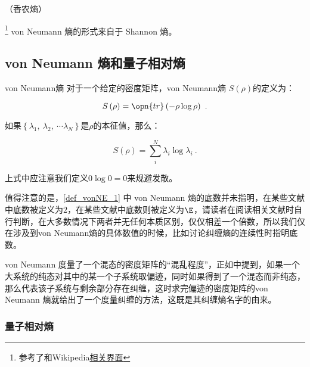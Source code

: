 
\begin{issues}
\issueTODO
\issueMissDepend（香农熵）
\end{issues}


\footnote{参考了\cite{量子信息}和Wikipedia\href{https://en.wikipedia.org/wiki/Von_Neumann_entropy}{相关界面}}
von Neumann 熵的形式来自于 Shannon 熵。

\subsection{von Neumann 熵和量子相对熵}

\begin{definition}{von Neumann熵}\label{def_vonNE_1}
对于一个给定的密度矩阵，von Neumann熵 $S\left(\rho\right)$的定义为：

\begin{equation}
S\left( \rho \right) = \opn{tr}\left( - \rho \log \rho \right)~.
\end{equation}

如果$\left\{ \lambda_1,~\lambda_2,~\cdots \lambda_N \right\}$是$\rho$的本征值，那么：

\begin{equation}
S\left(\rho\right) = \sum_i^N \lambda_i \log \lambda_i~.
\end{equation}

上式中应注意我们定义$0\log0 = 0$来规避发散。

\end{definition}

值得注意的是，\autoref{def_vonNE_1} 中 von Neumann 熵的底数并未指明，在某些文献中底数被定义为$2$，在某些文献中底数则被定义为$\E$，请读者在阅读相关文献时自行判断，在大多数情况下两者并无任何本质区别，仅仅相差一个倍数，所以我们仅在涉及到von Neumann熵的具体数值的时候，比如讨论纠缠熵的连续性时指明底数。

von Neumann 度量了一个混态的密度矩阵的“混乱程度”，正如中提到，如果一个大系统的纯态对其中的某一个子系统取偏迹，同时如果得到了一个混态而非纯态，那么代表该子系统与剩余部分存在纠缠，这时求完偏迹的密度矩阵的von Neumann 熵就给出了一个度量纠缠的方法，这既是其纠缠熵名字的由来。

\subsubsection{量子相对熵}

